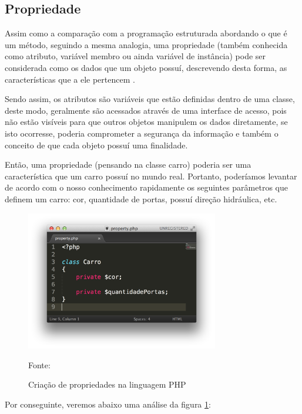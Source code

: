 \subsection{Propriedade}
Assim como a comparação com a programação estruturada abordando o que é um
método, seguindo a mesma analogia, uma propriedade (também conhecida como
atributo, variável membro ou ainda variável de instância) pode ser considerada
como os dados que um objeto possuí, descrevendo desta forma, as características
que a ele pertencem \cite{programmingPhp}.

Sendo assim, os atributos são variáveis que estão definidas dentro de uma
classe, deste modo, geralmente são acessados através de uma interface de acesso,
pois não estão visíveis para que outros objetos manipulem os dados diretamente,
se isto ocorresse, poderia comprometer a segurança da informação e também o
conceito de que cada objeto possuí uma finalidade.

Então, uma propriedade (pensando na classe carro) poderia ser uma característica
que um carro possuí no mundo real. Portanto, poderíamos levantar de acordo com
o nosso conhecimento rapidamente os seguintes parâmetros que definem um carro:
cor, quantidade de portas, possuí direção hidráulica, etc.

\begin{figure}[h!tb]
	\caption{Criação de propriedades na linguagem PHP}
	\label{fig:propriedade}

	\centering
	\includegraphics[width=0.75\textwidth]{images/property.png}

	\centering
	\footnotesize Fonte: \fonteOAutor
\end{figure}

\FloatBarrier 	%

Por conseguinte, veremos abaixo uma análise da figura \ref{fig:propriedade}:

